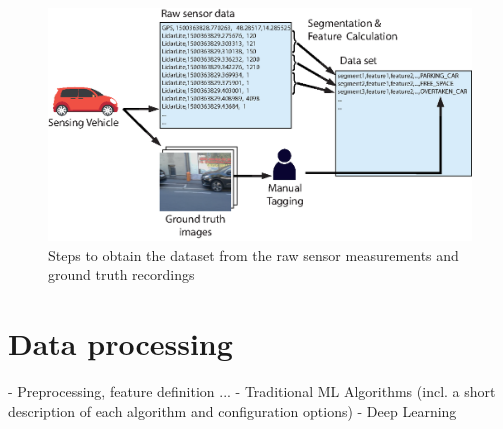 \begin{figure}
	\centering
	\includegraphics[width=\textwidth]{img/obtaining-dataset-architecture.eps}
	\caption{Steps to obtain the dataset from the raw sensor measurements and ground truth recordings}
	\label{fig:dataset_architecture}
\end{figure}

\section{Data processing}
\label{sec:data_processing}
- Preprocessing, feature definition ...
- Traditional ML Algorithms (incl. a short description of each algorithm and configuration options)
- Deep Learning